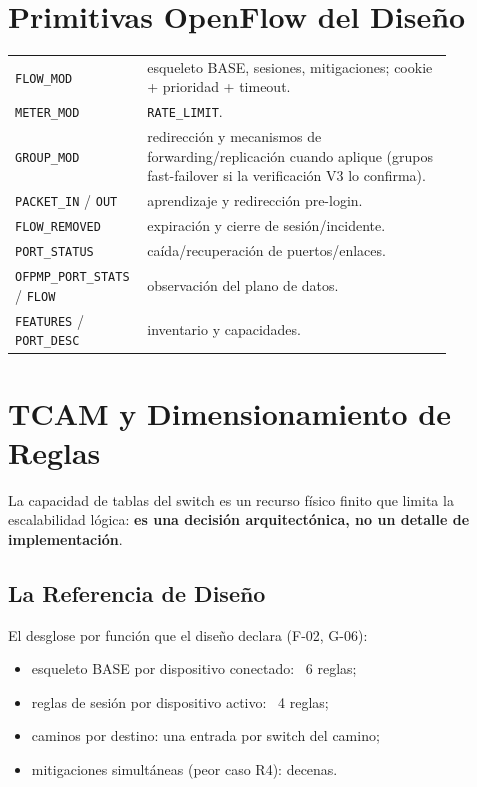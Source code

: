\documentclass[11pt,a4paper]{report}
\begin{document}
\section{Primitivas OpenFlow del Diseño}
\begin{longtable}{p{0.2\linewidth}p{0.67\linewidth}}
\toprule
\texttt{FLOW\_MOD} & esqueleto BASE, sesiones, mitigaciones; cookie + prioridad + timeout. \\
\texttt{METER\_MOD} & \texttt{RATE\_LIMIT}. \\
\texttt{GROUP\_MOD} & redirección y mecanismos de forwarding/replicación cuando aplique (grupos fast-failover si la verificación V3 lo confirma). \\
\texttt{PACKET\_IN} / \texttt{OUT} & aprendizaje y redirección pre-login. \\
\texttt{FLOW\_REMOVED} & expiración y cierre de sesión/incidente. \\
\texttt{PORT\_STATUS} & caída/recuperación de puertos/enlaces. \\
\texttt{OFPMP\_PORT\_STATS} / \texttt{FLOW} & observación del plano de datos. \\
\texttt{FEATURES} / \texttt{PORT\_DESC} & inventario y capacidades. \\
\bottomrule
\end{longtable}

\section{TCAM y Dimensionamiento de Reglas}
La capacidad de tablas del switch es un recurso físico finito que limita la escalabilidad lógica: \textbf{es una decisión arquitectónica, no un detalle de implementación}.

\subsection{La Referencia de Diseño}
El desglose por función que el diseño declara (F-02, G-06):
\begin{itemize}[leftmargin=*]
    \item esqueleto BASE por dispositivo conectado: ~6 reglas;
    \item reglas de sesión por dispositivo activo: ~4 reglas;
    \item caminos por destino: una entrada por switch del camino;
    \item mitigaciones simultáneas (peor caso R4): decenas.
\end{itemize}
\end{document}
